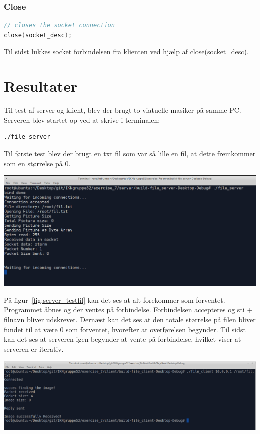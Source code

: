 \documentclass[12pt,fleqn,a4paper]{report}
\begin{document}
\subsection{Close}
\begin{framed}
\begin{lstlisting}[language=C++]
// closes the socket connection
close(socket_desc);
\end{lstlisting}
\end{framed}

Til sidst lukkes socket forbindelsen fra klienten ved hjælp af close(socket\_desc).

\newpage

\chapter{Resultater}

Til test af server og klient, blev der brugt to viatuelle masiker på samme PC. Serveren blev startet op ved at skrive i terminalen: \begin{lstlisting}[backgroundcolor = \color{lightgray}, language=bash]
./file_server
\end{lstlisting}

Til første test blev der brugt en txt fil som var så lille en fil, at dette fremkommer som en størrelse på 0.

\begin{center}
	\includegraphics[width=0.9 \textwidth]{server_testfil.png}
	\label{fig:server_testfil}
\end{center}

På figur~\ref{fig:server_testfil} kan det ses at alt forekommer som forventet. 
Programmet åbnes og der ventes på forbindelse. Forbindelsen accepteres og sti + filnavn bliver udskrevet. 
Dernæst kan det ses at den totale størrelse på filen bliver fundet til at være 0 som forventet, hvorefter at overførelsen begynder. 
Til sidst kan det ses at serveren igen begynder at vente på forbindelse, hvilket viser at serveren er iterativ.
\newpage
\begin{center}
	\includegraphics[width=0.9 \textwidth]{klient_testfil.png}
	\label{fig:klient_testfil}
\end{center}
\end{document}
